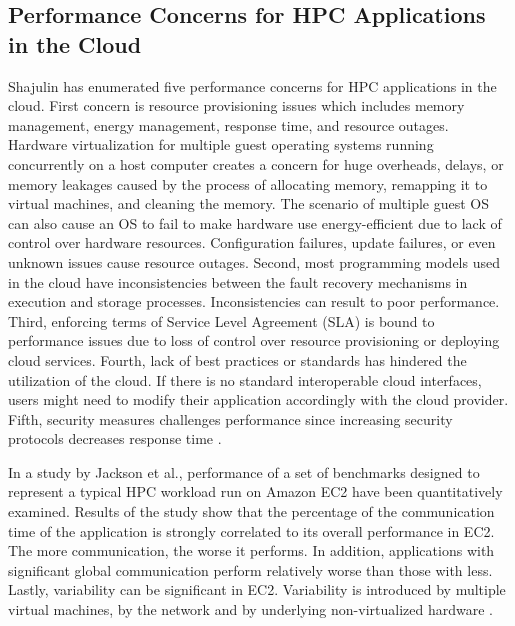 \documentclass[journal]{./IEEE/IEEEtran}
\begin{document}
    \subsection{Performance Concerns for HPC Applications in the Cloud}
        Shajulin \cite {8521133920130201} has enumerated five performance concerns for HPC applications in the cloud. First concern is resource provisioning issues which includes memory management, \newline \newline energy management, response time, and resource outages.  Hardware virtualization for multiple guest operating systems running concurrently on a host computer creates a concern for huge overheads, delays, or memory leakages caused by the process of allocating memory, remapping it to virtual machines, and cleaning the memory. The scenario of multiple guest OS can also cause an OS to fail to make hardware use energy-efficient due to lack of control over hardware resources. Configuration failures, update failures, or even unknown issues cause resource outages. Second, most programming models used in the cloud have inconsistencies between the fault recovery mechanisms in execution and  storage processes. Inconsistencies can result to poor performance. Third, enforcing terms of Service Level Agreement (SLA) is bound to performance issues due to loss of control over resource provisioning or deploying cloud services. Fourth, lack of best practices or standards has hindered the utilization of the cloud. If there is no standard interoperable cloud interfaces, users might need to modify their application accordingly with the cloud provider. Fifth, security measures challenges performance since increasing security protocols decreases response time \cite {8521133920130201}.

         In a study by Jackson et al.\cite{CloudCom2010}, performance of a set of benchmarks designed to represent a typical HPC workload run on Amazon EC2 have been quantitatively examined. Results of the study show that the percentage of the communication time of the application is strongly correlated to its overall performance in EC2. The more communication, the worse it performs. In addition, applications with significant global communication perform relatively worse than those with less. Lastly, variability can be significant in EC2. Variability is introduced by multiple virtual machines, by the network and by underlying non-virtualized hardware \cite{CloudCom2010}.
\end{document}
